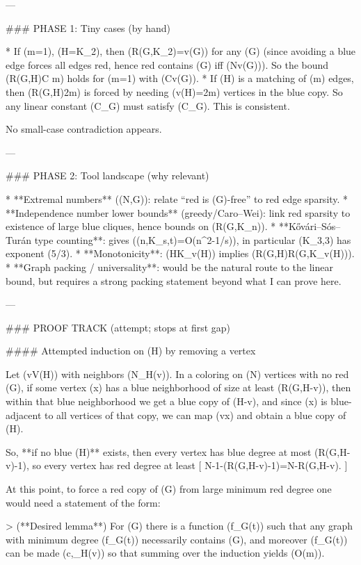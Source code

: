 ---

### PHASE 1: Tiny cases (by hand)

* If (m=1), (H=K_2), then (R(G,K_2)=v(G)) for any (G) (since avoiding a blue edge forces all edges red, hence red contains (G) iff (N\ge v(G))). So the bound (R(G,H)\le C m) holds for (m=1) with (C\ge v(G)).
* If (H) is a matching of (m) edges, then (R(G,H)\ge 2m) is forced by needing (v(H)=2m) vertices in the blue copy. So any linear constant (C_G) must satisfy (C_G). This is consistent.

No small-case contradiction appears.

---

### PHASE 2: Tool landscape (why relevant)

* **Extremal numbers** ((N,G)): relate “red is (G)-free” to red edge sparsity.
* **Independence number lower bounds** (greedy/Caro–Wei): link red sparsity to existence of large blue cliques, hence bounds on (R(G,K_n)).
* **Kővári–Sós–Turán type counting**: gives ((n,K_{s,t})=O(n^{2-1/s})), in particular (K_{3,3}) has exponent (5/3).
* **Monotonicity**: (H\subseteq K_{v(H)}) implies (R(G,H)\le R(G,K_{v(H)})).
* **Graph packing / universality**: would be the natural route to the linear bound, but requires a strong packing statement beyond what I can prove here.

---

### PROOF TRACK (attempt; stops at first gap)

#### Attempted induction on (H) by removing a vertex

Let (v\in V(H)) with neighbors (N_H(v)). In a coloring on (N) vertices with no red (G), if some vertex (x) has a blue neighborhood of size at least (R(G,H-v)), then within that blue neighborhood we get a blue copy of (H-v), and since (x) is blue-adjacent to all vertices of that copy, we can map (v\mapsto x) and obtain a blue copy of (H).

So, **if no blue (H)** exists, then every vertex has blue degree at most (R(G,H-v)-1), so every vertex has red degree at least
[
N-1-(R(G,H-v)-1)=N-R(G,H-v).
]

At this point, to force a red copy of (G) from large minimum red degree one would need a statement of the form:

> (**Desired lemma**) For (G) there is a function (f_G(t)) such that any graph with minimum degree (\ge f_G(t)) necessarily contains (G), and moreover (f_G(t)) can be made (\le c,\deg_H(v)) so that summing over the induction yields (O(m)).

